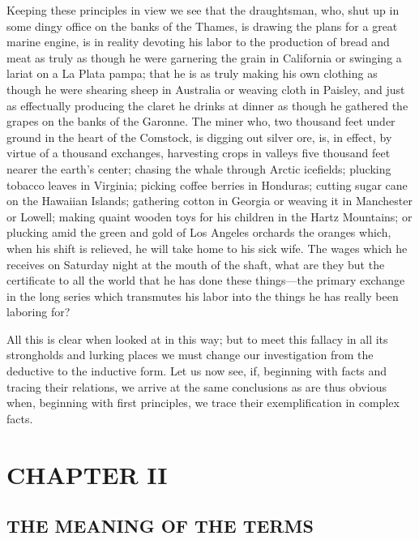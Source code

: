Keeping these principles in view we see that the draughtsman, who, shut
up in some dingy office on the banks of the Thames, is drawing the plans
for a great marine engine, is in reality devoting his labor to the
production of bread and meat as truly as though he were garnering the
grain in California or swinging a lariat on a La Plata pampa; that he is
as truly making his own clothing as though he were shearing sheep in
Australia or weaving cloth in Paisley, and just as effectually producing
the claret he drinks at dinner as though he gathered the grapes on the
banks of the Garonne. The miner who, two thousand feet under ground in
the heart of the Comstock, is digging out silver ore, is, in effect, by
virtue of a thousand exchanges, harvesting crops in valleys five
thousand feet nearer the earth's center; chasing the whale through
Arctic icefields; plucking tobacco leaves in Virginia; picking coffee
berries in Honduras; cutting sugar cane on the Hawaiian Islands;
gathering cotton in Georgia or weaving it in Manchester or Lowell;
making quaint wooden toys for his children in the Hartz Mountains; or
plucking amid the green and gold of Los Angeles orchards the oranges
which, when his shift is relieved, he will take home to his sick wife.
The wages which he receives on Saturday night at the mouth of the shaft,
what are they but the certificate to all the world that he has done
these things---the primary exchange in the long series which transmutes
his labor into the things he has really been laboring for?

All this is clear when looked at in this way; but to meet this fallacy
in all its strongholds and lurking places we must change our
investigation from the deductive to the inductive form. Let us now see,
if, beginning with facts and tracing their relations, we arrive at the
same conclusions as are thus obvious when, beginning with first
principles, we trace their exemplification in complex facts.

\newpage

\hypertarget{Book1Chapter2}{%
\section{CHAPTER II}\label{Book1Chapter2}}

\hypertarget{the-meaning-of-the-terms}{%
\subsection{THE MEANING OF THE TERMS}\label{the-meaning-of-the-terms}}

